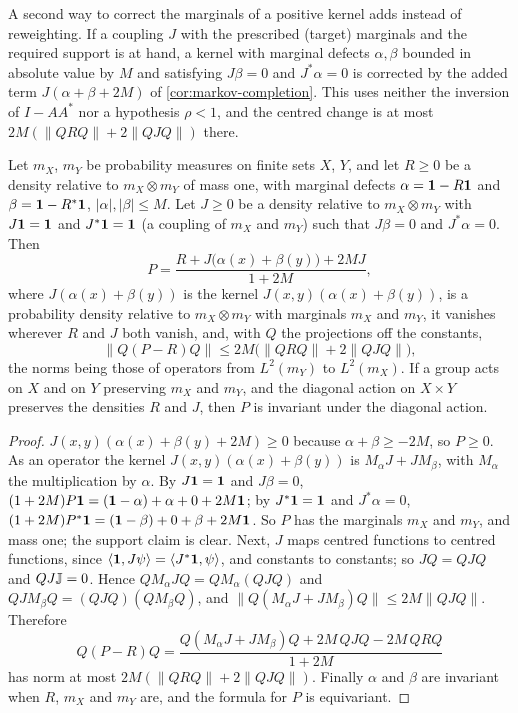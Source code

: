 A second way to correct the marginals of a positive kernel adds instead of
reweighting. If a coupling $J$ with the prescribed (target) marginals and the
required support is at hand, a kernel with marginal defects
$\alpha,\beta$ bounded in absolute value by $M$ and satisfying
$J\beta=0$ and $J^*\alpha=0$ is corrected by the added term
$J(\alpha+\beta+2M)$ of \cref{cor:markov-completion}. This uses
neither the inversion of $I-AA^*$ nor a hypothesis $\rho<1$, and the
centred change is at most $2M(\|QRQ\|+2\|QJQ\|)$ there.

\begin{corollary}\label{cor:markov-completion}
Let $m_X$, $m_Y$ be probability measures on finite sets $X$, $Y$, and let $R\ge0$
be a density relative to $m_X\otimes m_Y$ of mass one, with marginal defects
$\alpha=\mathbf 1-R\mathbf 1$ and $\beta=\mathbf 1-R^*\mathbf 1$, $|\alpha|,|\beta|\le M$. Let $J\ge0$ be a
density relative to $m_X\otimes m_Y$ with $J\mathbf 1=\mathbf 1$ and $J^*\mathbf 1=\mathbf 1$ (a
coupling of $m_X$ and $m_Y$) such that $J\beta=0$ and $J^*\alpha=0$. Then
\[
 P=\frac{R+J\bigl(\alpha(x)+\beta(y)\bigr)+2MJ}{1+2M},
\]
where $J(\alpha(x)+\beta(y))$ is the kernel $J(x,y)(\alpha(x)+\beta(y))$, is a
probability density relative to $m_X\otimes m_Y$ with marginals $m_X$ and $m_Y$,
it vanishes wherever $R$ and $J$ both vanish, and, with $Q$ the projections off
the constants,
\[
 \|Q(P-R)Q\|\le2M\bigl(\|QRQ\|+2\|QJQ\|\bigr),
\]
the norms being those of operators from $L^2(m_Y)$ to $L^2(m_X)$. If a group acts on $X$ and on $Y$ preserving $m_X$ and
$m_Y$, and the diagonal action on $X\times Y$ preserves the densities
$R$ and $J$, then $P$ is invariant under the diagonal action.
\end{corollary}

\begin{proof}
$J(x,y)(\alpha(x)+\beta(y)+2M)\ge0$ because $\alpha+\beta\ge-2M$, so $P\ge0$. As an
operator the kernel $J(x,y)(\alpha(x)+\beta(y))$ is $M_\alpha J+JM_\beta$, with
$M_\alpha$ the multiplication by $\alpha$. By $J\mathbf 1=\mathbf 1$ and $J\beta=0$,
$(1+2M)P\mathbf 1=(\mathbf 1-\alpha)+\alpha+0+2M\mathbf 1$; by $J^*\mathbf 1=\mathbf 1$ and $J^*\alpha=0$,
$(1+2M)P^*\mathbf 1=(\mathbf 1-\beta)+0+\beta+2M\mathbf 1$. So $P$ has the marginals $m_X$ and
$m_Y$, and mass one; the support claim is clear. Next, $J$ maps centred functions
to centred functions, since $\left\langle \mathbf 1,J\psi\right\rangle=\left\langle J^*\mathbf 1,\psi\right\rangle$, and constants to
constants; so $JQ=QJQ$ and $QJ\mathbb J=0$. Hence $QM_\alpha JQ=QM_\alpha(QJQ)$ and
$QJM_\beta Q=(QJQ)(QM_\beta Q)$, and
$\|Q(M_\alpha J+JM_\beta)Q\|\le2M\|QJQ\|$. Therefore
\[
 Q(P-R)Q=\frac{Q(M_\alpha J+JM_\beta)Q+2M\,QJQ-2M\,QRQ}{1+2M}
\]
has norm at most $2M(\|QRQ\|+2\|QJQ\|)$. Finally $\alpha$ and $\beta$ are invariant
when $R$, $m_X$ and $m_Y$ are, and the formula for $P$ is equivariant.
\end{proof}

